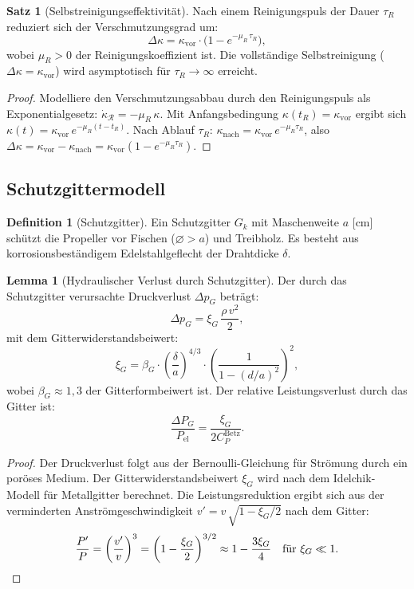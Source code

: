 ﻿\documentclass[a4paper,12pt]{article}
\theoremstyle{definition}
\newtheorem{definition}{Definition}
\newtheorem{satz}{Satz}
\newtheorem{lemma}{Lemma}
\begin{document}
\begin{satz}[Selbstreinigungseffektivität]
\label{satz:reinigeff}
Nach einem Reinigungspuls der Dauer $\tau_R$ reduziert sich der Verschmutzungsgrad
um:
\[
  \Delta\kappa = \kappa_{\mathrm{vor}} \cdot \bigl(1 - e^{-\mu_R\,\tau_R}\bigr),
\]
wobei $\mu_R > 0$ der Reinigungskoeffizient ist. Die vollständige Selbstreinigung
($\Delta\kappa = \kappa_{\mathrm{vor}}$) wird asymptotisch für $\tau_R \to \infty$ erreicht.
\end{satz}

\begin{proof}
Modelliere den Verschmutzungsabbau durch den Reinigungspuls als Exponentialgesetz:
$\dot{\kappa}_{\mathcal{R}} = -\mu_R\,\kappa$. Mit Anfangsbedingung
$\kappa(t_R) = \kappa_{\mathrm{vor}}$ ergibt sich
$\kappa(t) = \kappa_{\mathrm{vor}}\,e^{-\mu_R(t - t_R)}$. Nach Ablauf $\tau_R$:
$\kappa_{\mathrm{nach}} = \kappa_{\mathrm{vor}}\,e^{-\mu_R\tau_R}$, also
$\Delta\kappa = \kappa_{\mathrm{vor}} - \kappa_{\mathrm{nach}} =
\kappa_{\mathrm{vor}}(1 - e^{-\mu_R\tau_R})$. \qedhere
\end{proof}

\subsection{Schutzgittermodell}

\begin{definition}[Schutzgitter]
Ein Schutzgitter $G_k$ mit Maschenweite $a$ [cm] schützt die Propeller vor Fischen
($\varnothing > a$) und Treibholz. Es besteht aus korrosionsbeständigem Edelstahlgeflecht
der Drahtdicke $\delta$.
\end{definition}

\begin{lemma}[Hydraulischer Verlust durch Schutzgitter]
\label{lem:gitter}
Der durch das Schutzgitter verursachte Druckverlust $\Delta p_G$ beträgt:
\[
  \Delta p_G = \xi_G\,\frac{\rho\,v^2}{2},
\]
mit dem Gitterwiderstandsbeiwert:
\[
  \xi_G = \beta_G \cdot \left(\frac{\delta}{a}\right)^{4/3}
          \cdot \left(\frac{1}{1 - (d/a)^2}\right)^2,
\]
wobei $\beta_G \approx 1{,}3$ der Gitterformbeiwert ist.
Der relative Leistungsverlust durch das Gitter ist:
\[
  \frac{\Delta P_G}{P_{\mathrm{el}}} = \frac{\xi_G}{2C_P^{\mathrm{Betz}}}.
\]
\end{lemma}

\begin{proof}
Der Druckverlust folgt aus der Bernoulli-Gleichung für Strömung durch ein poröses
Medium. Der Gitterwiderstandsbeiwert $\xi_G$ wird nach dem Idelchik-Modell für
Metallgitter berechnet. Die Leistungsreduktion ergibt sich aus der verminderten
Anströmgeschwindigkeit $v' = v\,\sqrt{1 - \xi_G/2}$ nach dem Gitter:
\[
  \frac{P'}{P} = \left(\frac{v'}{v}\right)^3 = \left(1 - \frac{\xi_G}{2}\right)^{3/2}
              \approx 1 - \frac{3\xi_G}{4} \quad\text{für }\xi_G \ll 1. \qedhere
\]
\end{proof}
\end{document}
